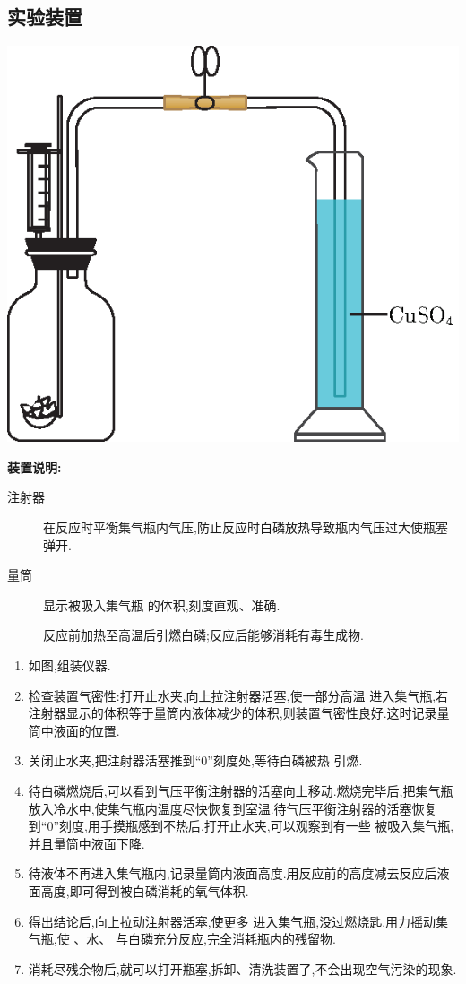 \documentclass[11pt,a4paper,titlepage,twocolumn]{ctexart}
\begin{document}
	\subsection{实验装置}
	
	\begin{center}
		\includegraphics[width=0.6\linewidth]{fig/6}
	\end{center}
	
	\noindent\textbf{装置说明:} \indent\par
	\begin{description}
		\item[注射器] 在反应时平衡集气瓶内气压,防止反应时白磷放热导致瓶内气压过大使瓶塞弹开.
		\item[量筒] 显示被吸入集气瓶 的体积,刻度直观、准确.
		\item[] 反应前加热至高温后引燃白磷;反应后能够消耗有毒生成物.
	\end{description}
	
	\begin{enumerate}
		\item 如图,组装仪器.
		\item 检查装置气密性:打开止水夹,向上拉注射器活塞,使一部分高温 进入集气瓶,若注射器显示的体积等于量筒内液体减少的体积,则装置气密性良好.这时记录量筒中液面的位置.
		\item 关闭止水夹,把注射器活塞推到``0''刻度处,等待白磷被热 引燃.
		\item 待白磷燃烧后,可以看到气压平衡注射器的活塞向上移动.燃烧完毕后,把集气瓶放入冷水中,使集气瓶内温度尽快恢复到室温.待气压平衡注射器的活塞恢复到``0''刻度,用手摸瓶感到不热后,打开止水夹,可以观察到有一些 被吸入集气瓶,并且量筒中液面下降.
		\item 待液体不再进入集气瓶内,记录量筒内液面高度.用反应前的高度减去反应后液面高度,即可得到被白磷消耗的氧气体积.
		\item 得出结论后,向上拉动注射器活塞,使更多 进入集气瓶,没过燃烧匙.用力摇动集气瓶,使 、水、 与白磷充分反应,完全消耗瓶内的残留物.
		\item 消耗尽残余物后,就可以打开瓶塞,拆卸、清洗装置了,不会出现空气污染的现象.
	\end{enumerate}
	
\end{document}
